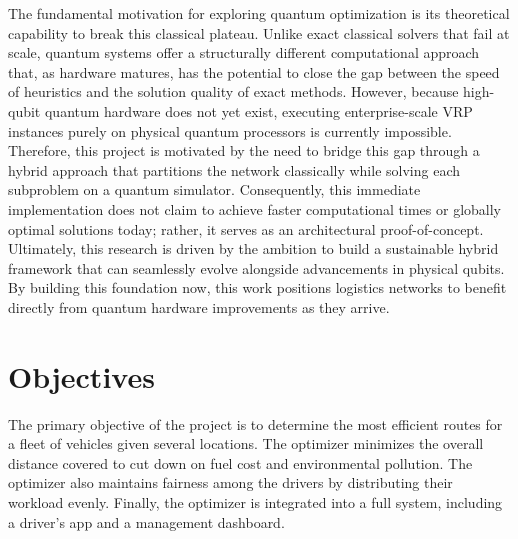 \documentclass[a4paper]{report}
\begin{document}
{\begin{itemize}
The fundamental motivation for exploring quantum optimization is its theoretical capability to break this classical plateau. Unlike exact classical solvers that fail at scale, quantum systems offer a structurally different computational approach that, as hardware matures, has the potential to close the gap between the speed of heuristics and the solution quality of exact methods. However, because high-qubit quantum hardware does not yet exist, executing enterprise-scale VRP instances purely on physical quantum processors is currently impossible. Therefore, this project is motivated by the need to bridge this gap through a hybrid approach that partitions the network classically while solving each subproblem on a quantum simulator. Consequently, this immediate implementation does not claim to achieve faster computational times or globally optimal solutions today; rather, it serves as an architectural proof-of-concept. Ultimately, this research is driven by the ambition to build a sustainable hybrid framework that can seamlessly evolve alongside advancements in physical qubits. By building this foundation now, this work positions logistics networks to benefit directly from quantum hardware improvements as they arrive.

\section{Objectives}
The primary objective of the project is to determine the most efficient routes for a fleet of vehicles given several locations. The optimizer minimizes the overall distance covered to cut down on fuel cost and environmental pollution. The optimizer also maintains fairness among the drivers by distributing their workload evenly. Finally, the optimizer is integrated into a full system, including a driver’s app and a management dashboard. 



\end{itemize}}
\end{document}
